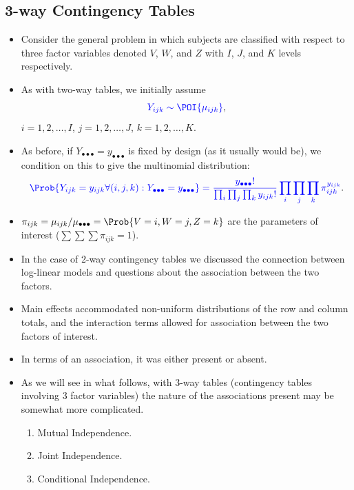 \documentclass[oneside]{book}\usepackage[]{graphicx}\usepackage[svgnames]{xcolor}
\providecommand\given{} %
\renewcommand\given{\nonscript\:\delimsize\vert\nonscript\:\mathopen{}}%
\renewcommand\given{\nonscript\:\delimsize\vert\nonscript\:\mathopen{}}%
\renewcommand\given{\nonscript\:\delimsize\vert\nonscript\:\mathopen{}}%
\renewcommand\given{\nonscript\:\delimsize\vert\nonscript\:\mathopen{}}%
\renewcommand\given{\nonscript\:\delimsize\vert\nonscript\:\mathopen{}}%
\renewcommand\given{\nonscript\:\delimsize\vert\nonscript\:\mathopen{}}%
\renewcommand\given{\nonscript\:\delimsize\vert\nonscript\:\mathopen{}}%
\renewcommand\given{\nonscript\:\delimsize\vert\nonscript\:\mathopen{}}%
\renewcommand\given{\nonscript\:\delimsize\vert\nonscript\:\mathopen{}}%
\renewcommand\given{\nonscript\:\delimsize\vert\nonscript\:\mathopen{}}%
\renewcommand\given{\nonscript\:\delimsize\vert\nonscript\:\mathopen{}}%
\renewcommand\given{\nonscript\:\delimsize\vert\nonscript\:\mathopen{}}%
\renewcommand\given{:}
\begin{document}
\subsection*{3-way Contingency Tables}
\begin{itemize}
      \item Consider the general problem in which subjects are classified with respect to three
            factor variables denoted $V$, $W$, and $Z$ with $I$, $J$, and $K$ levels respectively.
      \item As with two-way tables, we initially assume
            \[ \textcolor{Blue}{Y_{ijk}\sim \POI{\mu_{ijk}}}, \]
            $ i=1,2,\ldots,I $, $ j=1,2,\ldots,J $, $ k=1,2,\ldots,K $.
      \item As before, if $ Y_{\bullet\bullet\bullet}=y_{\bullet\bullet\bullet} $ is fixed by design (as it usually would be),
            we condition on this to give the multinomial distribution:
            \[ \textcolor{Blue}{ \Prob{Y_{ijk}=y_{ijk}\forall (i,j,k)\given Y_{\bullet\bullet\bullet}=y_{\bullet\bullet\bullet} }
                  =\frac{y_{\bullet\bullet\bullet}!}{\prod_i\prod_j\prod_k y_{ijk}!}\prod_i\prod_j\prod_k \pi_{ijk}^{y_{ijk}}}. \]
      \item $ \pi_{ijk}=\mu_{ijk}/\mu_{\bullet\bullet\bullet}=\Prob{V=i,W=j,Z=k} $ are the parameters of interest ($ \sum\sum\sum \pi_{ijk}=1 $).
      \item In the case of 2-way contingency tables we discussed the connection between
            log-linear models and questions about the association between the two factors.
      \item Main effects accommodated non-uniform distributions of the row and column
            totals, and the interaction terms allowed for association between the two factors
            of interest.
      \item In terms of an association, it was either present or absent.
      \item As we will see in what follows, with 3-way tables (contingency tables involving 3
            factor variables) the nature of the associations present may be somewhat more
            complicated.
            \begin{enumerate}[1.]
                  \item Mutual Independence.
                  \item Joint Independence.
                  \item Conditional Independence.

\end{enumerate}
\end{itemize}
\end{document}
